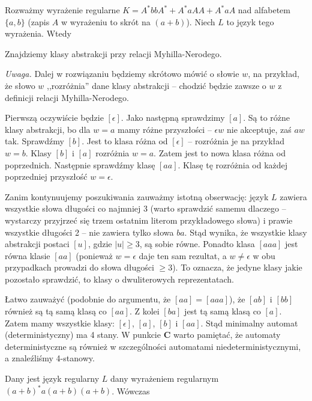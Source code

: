 \begin{solutions}

    \sol Rozważmy wyrażenie regularne $K=A^* bb A^* + A^* a A A + A^* a A$ nad alfabetem $\{a,b\}$ (zapis $A$ w wyrażeniu to skrót na $(a + b)$). Niech $L$ to język tego wyrażenia. Wtedy

    Znajdziemy klasy abstrakcji przy relacji Myhilla-Nerodego. 
    
    \textit{Uwaga.} Dalej w rozwiązaniu będziemy skrótowo mówić o słowie $w$, na przykład, że słowo $w$ ,,rozróżnia'' dane klasy abstrakcji -- chodzić będzie zawsze o $w$ z definicji relacji Myhilla-Nerodego.
    
    Pierwszą oczywiście będzie $[\epsilon]$. Jako następną sprawdzimy $[a]$. Są to różne klasy abstrakcji, bo dla $w = a$ mamy różne przyszłości -- $\epsilon w$ nie akceptuje, zaś $a w$ tak. Sprawdźmy $[b]$. Jest to klasa różna od $[\epsilon]$ -- rozróżnia je na przykład $w = b$. Klasy $[b]$ i $[a]$ rozróżnia $w = a$. Zatem jest to nowa klasa różna od poprzednich. Następnie sprawdźmy klasę $[aa]$. Klasę tę rozróżnia od każdej poprzedniej przyszłość $w = \epsilon$. 
    
    Zanim kontynuujemy poszukiwania zauważmy istotną obserwację: język $L$ zawiera wszystkie słowa długości co najmniej 3 (warto sprawdzić samemu dlaczego -- wystarczy przyjrzeć się trzem ostatnim literom przykładowego słowa) i prawie wszystkie długości 2 -- nie zawiera tylko słowa $ba$. Stąd wynika, że wszystkie klasy abstrakcji postaci $[u]$, gdzie $|u| \geqslant 3$, są sobie równe. Ponadto klasa $[aaa]$ jest równa klasie $[aa]$ (ponieważ $w = \epsilon$ daje ten sam rezultat, a $w \not= \epsilon$ w obu przypadkach prowadzi do słowa długości $\geqslant 3$). To oznacza, że jedyne klasy jakie pozostało sprawdzić, to klasy o dwuliterowych reprezentatach.
    
    Łatwo zauważyć (podobnie do argumentu, że $[aa] = [aaa]$), że $[ab]$ i $[bb]$ również są tą samą klasą co $[aa]$. Z kolei $[ba]$ jest tą samą klasą co $[a]$. Zatem mamy wszystkie klasy: $[\epsilon]$, $[a]$, $[b]$ i $[aa]$. Stąd minimalny automat (deterministyczny) ma 4 stany. W punkcie $\mathbf{C}$ warto pamiętać, że automaty deterministyczne są również w szczególności automatami niedeterministycznymi, a znaleźliśmy 4-stanowy.

    \sol Dany jest język regularny $L$ dany wyrażeniem regularnym $(a+b)^*a(a+b)(a+b)$. Wówczas


\end{solutions}
